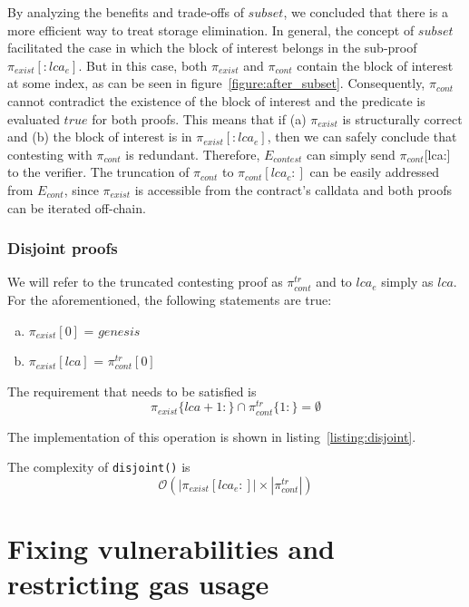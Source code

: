 By analyzing the benefits and trade-offs of $subset$, we concluded that there
is a more efficient way to treat storage elimination. In general, the concept
of $subset$ facilitated the case in which the block of interest belongs in the
sub-proof $\pi_{exist}[:lca_{e}]$. But in this case, both $\pi_{exist}$ and
$\pi_{cont}$ contain the block of interest at some index, as can be seen in
figure~\ref{figure:after_subset}. Consequently, $\pi_{cont}$ cannot contradict
the existence of the block of interest and the predicate is evaluated $true$
for both proofs. This means that if (a) $\pi_{exist}$ is structurally correct
and (b) the block of interest is in $\pi_{exist}[:lca_{e}]$, then we can safely
conclude that contesting with $\pi_{cont}$ is redundant. Therefore,
$E_{contest}$ can simply send $\pi_{cont}$[lca:] to the verifier. The
truncation of $\pi_{cont}$ to $\pi_{cont}[lca_{c}:]$ can be easily addressed
from $E_{cont}$, since $\pi_{exist}$ is accessible from the contract's
calldata and both proofs can be iterated off-chain.

\newcommand*{\exist}{$\pi_{exist}$}
\newcommand*{\cont}{$\pi_{cont}^{tr}$}

\subsubsection{Disjoint proofs}

We will refer to the truncated contesting proof as $\pi_{cont}^{tr}$ and to
$lca_{e}$ simply as $lca$. For the aforementioned, the following statements are
true:

\begin{enumerate}[(a)]
    \item  $\pi_{exist}[0]$ = $genesis$
    \item  $\pi_{exist}[lca]$ = $\pi_{cont}^{tr}[0]$
\end{enumerate}

The requirement that needs to be satisfied is
\[\pi_{exist}\{lca+1:\} \cap \pi_{cont}^{tr}\{1:\} = \emptyset \]

The implementation of this operation is shown in
listing~\ref{listing:disjoint}.



The complexity of \texttt{disjoint()} is
\[ \mathcal{O}(|\pi_{exist}[lca_{e}:]| \times
|\pi_{cont}^{tr}|) \]

\section{Fixing vulnerabilities and restricting gas usage}

%
%
